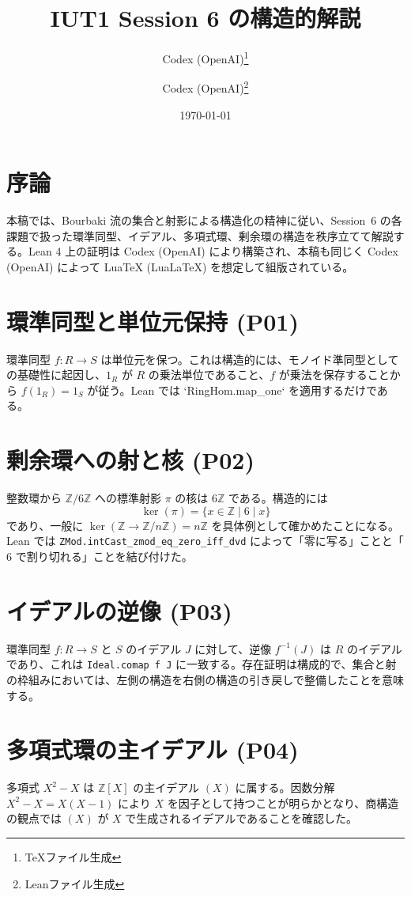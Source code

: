 \documentclass[uplatex,12pt]{ltjsarticle}
\title{IUT1 Session 6 の構造的解説}
\author{Codex (OpenAI)\thanks{TeXファイル生成}\and Codex (OpenAI)\thanks{Leanファイル生成}}
\date{\today}
\theoremstyle{definition}
\theoremstyle{remark}
\begin{document}
\maketitle

\section{序論}
本稿では、Bourbaki 流の集合と射影による構造化の精神に従い、Session~6 の各課題で扱った環準同型、イデアル、多項式環、剰余環の構造を秩序立てて解説する。Lean 4 上の証明は Codex (OpenAI) により構築され、本稿も同じく Codex (OpenAI) によって Lua\TeX{} (LuaLaTeX) を想定して組版されている。

\section{環準同型と単位元保持 (P01)}
環準同型 $f \colon R \to S$ は単位元を保つ。これは構造的には、モノイド準同型としての基礎性に起因し、$1_R$ が $R$ の乗法単位であること、$f$ が乗法を保存することから $f(1_R) = 1_S$ が従う。Lean では `RingHom.map_one` を適用するだけである。

\section{剰余環への射と核 (P02)}
整数環から $\mathbb{Z}/6\mathbb{Z}$ への標準射影 $\pi$ の核は $6\mathbb{Z}$ である。構造的には
\[
  \ker(\pi) = \{ x \in \mathbb{Z} \mid 6 \mid x \}
\]
であり、一般に $\ker(\mathbb{Z} \to \mathbb{Z}/n\mathbb{Z}) = n\mathbb{Z}$ を具体例として確かめたことになる。Lean では \texttt{ZMod.intCast\_zmod\_eq\_zero\_iff\_dvd} によって「零に写る」ことと「$6$ で割り切れる」ことを結び付けた。

\section{イデアルの逆像 (P03)}
環準同型 $f \colon R \to S$ と $S$ のイデアル $J$ に対して、逆像 $f^{-1}(J)$ は $R$ のイデアルであり、これは \texttt{Ideal.comap f J} に一致する。存在証明は構成的で、集合と射の枠組みにおいては、左側の構造を右側の構造の引き戻しで整備したことを意味する。

\section{多項式環の主イデアル (P04)}
多項式 $X^2 - X$ は $\mathbb{Z}[X]$ の主イデアル $(X)$ に属する。因数分解 $X^2 - X = X(X-1)$ により $X$ を因子として持つことが明らかとなり、商構造の観点では $(X)$ が $X$ で生成されるイデアルであることを確認した。
\end{document}
